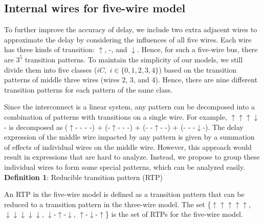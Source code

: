 \documentclass[10pt,journal]{IEEEtran}
\def\d{\downarrow}
\def\u{\uparrow}
\begin{document}
\subsection{Internal wires for five-wire model}\label{sec:5w}
To further improve the accuracy of delay, we include two extra adjacent wires to approximate the delay by considering the influences of all five wires. Each wire has three kinds of transition: $\uparrow$, -, and $\downarrow$. Hence, for such a five-wire bus, there are $3^5$ transition patterns. To maintain the simplicity of our models, we still divide them into five classes ($iC, \; i\in \{0,1,2,3,4\}$) based on the transition patterns of middle three wires (wires 2, 3, and 4). Hence, there are nine different transition patterns for each pattern of the same class.

Since the interconnect is a linear system, any pattern can be decomposed into a combination of patterns with transitions on a single wire. For example, $\u\u\u\d$- is decomposed as ($\u$- - - -) +  (-$\u$- - -) + (- -$\u$- -) + (- - -$\d$-). The delay expression of the middle wire impacted by any pattern is given by a summation of effects of individual wires on the middle wire.
However, this approach would result in expressions that are hard to analyze. Instead, we propose to group these individual wires to form some special patterns, which can be analyzed easily.\\

\textbf{Definition 1}: Reducible transition pattern (RTP)

An RTP in the five-wire model is defined as a transition pattern that can be reduced to a transition pattern in the three-wire model. The set \{$\uparrow \uparrow \uparrow \uparrow \uparrow$, $\downarrow\downarrow\downarrow\downarrow\downarrow$, $\downarrow$-$\uparrow$-$\downarrow$, $\uparrow$-$\downarrow$-$\uparrow$\} is the set of RTPs for the five-wire model.
\end{document}
